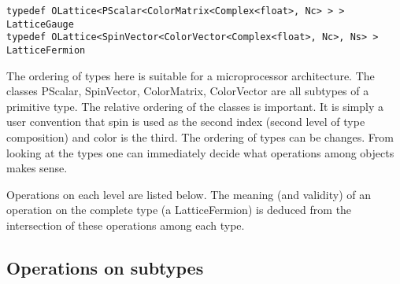 \documentclass[12pt,letterpaper]{article}
\begin{document}
\begin{verbatim}
typedef OLattice<PScalar<ColorMatrix<Complex<float>, Nc> > > LatticeGauge
typedef OLattice<SpinVector<ColorVector<Complex<float>, Nc>, Ns> > LatticeFermion
\end{verbatim}
%
The ordering of types here is suitable for a microprocessor
architecture.  The classes PScalar, SpinVector, ColorMatrix,
ColorVector are all subtypes of a primitive type. The relative
ordering of the classes is important. It is simply a user convention
that spin is used as the second index (second level of type
composition) and color is the third. The ordering of types can be
changes. From looking at the types one can immediately decide what
operations among objects makes sense.

Operations on each level are listed below. The meaning (and validity)
of an operation on the complete type (a LatticeFermion) is deduced
from the intersection of these operations among each type.

\subsection{Operations on subtypes}
\end{document}
